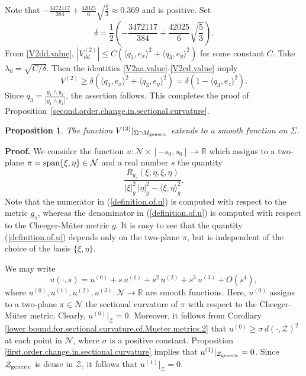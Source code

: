 \documentclass[11pt]{amsart}
\newtheorem{proposition}[theorem]{Proposition}
\theoremstyle{definition}
\begin{document}
Note that $  -\frac{3472117}{384}+\frac{42025}{6}\sqrt{\frac{5}{3}}\approx 0.369$ and is positive.
Set 
\[\delta=\frac{1}{2}\left( -\frac{3472117}{384}+\frac{42025}{6}\sqrt{\frac{5}{3}}\right).\]
From \eqref{V2dd.value}, $|V^{(2)}_{dd}|\leq C(\langle q_3,e_x \rangle^2+\langle q_3,e_y \rangle^2)$ for some constant $C$. 
Take $\lambda_0=\sqrt{C/\delta}$. Then the identities \eqref{V2aa.value}-\eqref{V2cd.value} imply
\[V^{(2)} \geq \delta (\langle q_3,e_x \rangle^2+\langle q_3,e_y \rangle^2) = \delta (1 - \langle q_3,e_z \rangle^2).\] 
Since $q_3 = \frac{y_1 \wedge y_2}{|y_1 \wedge y_2|}$, the assertion follows. This completes the proof of Proposition~\ref{second.order.change.in.sectional.curvature}. \\


\begin{proposition}
\label{V3.extends.smoothly}
The function $V^{(3)}|_{\Sigma \cap M_{\text{\rm generic}}}$ extends to a smooth function on $\Sigma$. 
\end{proposition}

\textbf{Proof.}
We consider the function $u: \mathcal{N} \times [-s_0,s_0] \to \mathbb{R}$ which assigns to a two-plane $\pi = \text{\rm span}\{\xi,\eta\} \in \mathcal{N}$ and a real number $s$ the quantity 
\begin{equation} 
\label{definition.of.u}
\frac{R_{g_s}(\xi,\eta,\xi,\eta)}{|\xi|_g^2 \, |\eta|_g^2 - \langle \xi,\eta \rangle_g^2}. 
\end{equation}
Note that the numerator in (\ref{definition.of.u}) is computed with respect to the metric $g_s$, whereas the denominator in (\ref{definition.of.u}) is computed with respect to the Cheeger-M\"uter metric $g$. It is easy to see that the quantity (\ref{definition.of.u}) depends only on the two-plane $\pi$, but is independent of the choice of the basis $\{\xi,\eta\}$. 

We may write 
\begin{equation} 
\label{Taylor.expansion.of.u}
u(\cdot,s) = u^{(0)} + s \, u^{(1)} + s^2 \, u^{(2)} + s^3 \, u^{(3)} + O(s^4), 
\end{equation}
where $u^{(0)},u^{(1)},u^{(2)},u^{(3)}: \mathcal{N} \to \mathbb{R}$ are smooth functions. Here, $u^{(0)}$ assigns to a two-plane $\pi \in \mathcal{N}$ the sectional curvature of $\pi$ with respect to the Cheeger-M\"uter metric. Clearly, $u^{(0)}|_{\mathcal{Z}} = 0$. Moreover, it follows from Corollary \ref{lower.bound.for.sectional.curvature.of.Mueter.metrics.2} that $u^{(0)} \geq \sigma \, d(\cdot,\mathcal{Z})^2$ at each point in $\mathcal{N}$, where $\sigma$ is a positive constant. Proposition \ref{first.order.change.in.sectional.curvature} implies that $u^{(1)}|_{\mathcal{Z}_{\text{\rm generic}}} = 0$. Since $\mathcal{Z}_{\text{\rm generic}}$ is dense in $\mathcal{Z}$, it follows that $u^{(1)}|_{\mathcal{Z}} = 0$.
\end{document}
